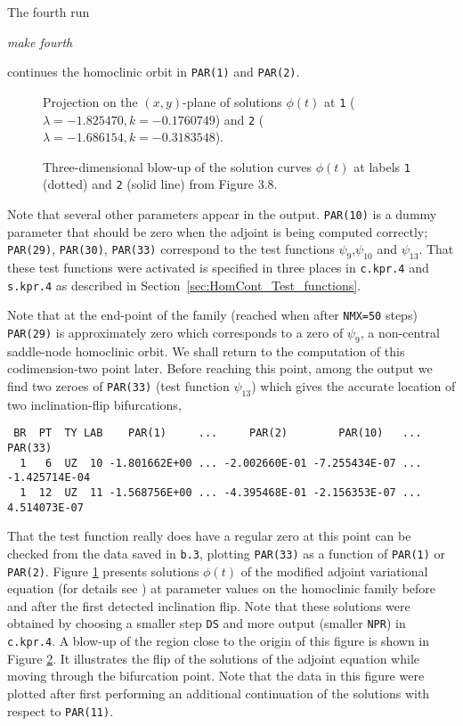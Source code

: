 \documentclass[12pt]{report}
\begin{document}
The fourth run
\begin{center}
{\it make fourth}
\end{center}
continues the homoclinic orbit in {\tt PAR(1)} and {\tt PAR(2)}. 
%
\begin{figure}[p]
\epsfysize 9.0cm
\centerline{}
\caption{Projection on the $(x,y)$-plane of solutions $\phi(t)$
at {\tt 1} ($\lambda=-1.825470, k=-0.1760749$) and
{\tt 2} ($\lambda=-1.686154, k=-0.3183548$).}
\label{kf.2a}
\end{figure}
\begin{figure}[p]
\epsfysize 8.0cm
\centerline{}
\caption{Three-dimensional blow-up of the solution curves
 $\phi(t)$ 
at labels {\tt 1} (dotted) and {\tt 2} (solid line) from Figure 3.8.}
\label{kf.2b}
\end{figure}
%
Note that several other parameters appear in
the output. {\tt PAR(10)} is a dummy parameter
that should be zero when the adjoint is being computed correctly;
{\tt PAR(29)}, {\tt PAR(30)}, {\tt PAR(33)} correspond to the
test functions $\psi_9$,$\psi_{10}$ and $\psi_{13}$. 
That these test functions were activated is specified
in three places in {\tt c.kpr.4} and {\tt s.kpr.4} 
as described in Section~\ref{sec:HomCont_Test_functions}.  

Note that at the end-point of
the family (reached when after {\tt NMX=50} steps) {\tt PAR(29)} is
approximately zero which corresponds to a zero of $\psi_9$, a 
non-central saddle-node homoclinic orbit. We shall return to the computation of
this codimension-two point later. Before reaching this point,
among the output we find two zeroes of {\tt PAR(33)}
(test function $\psi_{13}$) which gives the accurate
location of two inclination-flip bifurcations,
\begin{verbatim}
 BR  PT  TY LAB    PAR(1)     ...     PAR(2)        PAR(10)   ...    PAR(33)  
  1   6  UZ  10 -1.801662E+00 ... -2.002660E-01 -7.255434E-07 ... -1.425714E-04
  1  12  UZ  11 -1.568756E+00 ... -4.395468E-01 -2.156353E-07 ...  4.514073E-07
\end{verbatim}
That the test function really does have a regular zero at this point can
be checked from the data saved in {\tt b.3}, plotting {\tt PAR(33)} as
a function of {\tt PAR(1)} or {\tt PAR(2)}. 
Figure \ref{kf.2a} presents solutions $\phi(t)$ of the modified adjoint 
variational equation (for details see )
at parameter values on the homoclinic 
family before and after the first detected inclination flip. 
Note that these solutions were obtained by choosing a smaller
step {\tt DS} and more output (smaller {\tt NPR}) in
{\tt c.kpr.4}.
A blow-up of the region close to the origin of this 
figure is shown in Figure \ref{kf.2b}.
It illustrates the flip of the solutions of the adjoint equation while
moving through the bifurcation point. Note that the data in this
figure were plotted after first performing an additional
continuation of the solutions with respect to {\tt PAR(11)}. 
\end{document}
